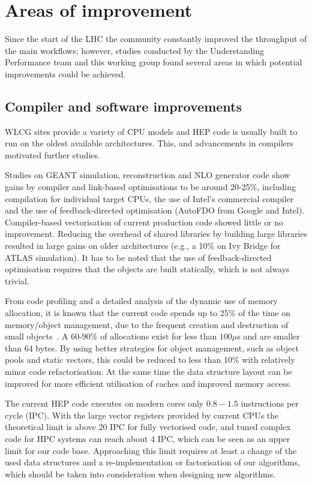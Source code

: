 \section{Areas of improvement}
Since the start of the LHC the community constantly improved the
throughput of the main workflows; however, studies conducted by the
Understanding Performance team and this working group found several
areas in which potential improvements could be
achieved.

\subsection{Compiler and software improvements}
WLCG sites provide a variety of CPU models and HEP code is usually
built to run on the oldest available architectures. This, and
advancements in compilers motivated further studies.

Studies on GEANT simulation, reconstruction and NLO generator code
show gains by compiler and link-based optimisations to be around
20-25\%, including compilation for individual target CPUs, the use of
Intel’s commercial compiler and the use of feedback-directed
optimisation (AutoFDO from Google and Intel). Compiler-based
vectorisation of current production code showed little or no
improvement. Reducing the overhead of shared libraries by building
large libraries resulted in large gains on older architectures (e.g.,
a 10\% on Ivy Bridge for ATLAS simulation). It has to be noted that
the use of feedback-directed optimisation requires that the objects
are built statically, which is not always trivial.

From code profiling and a detailed analysis of the dynamic use of
memory allocation, it is known that the current code spends up to 25\%
of the time on memory/object management, due to the frequent creation
and destruction of small objects~\cite{fomtools}. A 60-90\% of
allocations exist for less than $100\mu$s and are smaller than 64
bytes.  By using better strategies for object management, such as
object pools and static vectors, this could be reduced to less than
10\% with relatively minor code refactorisation. At the same time the
data structure layout can be improved for more efficient utilisation
of caches and improved memory access.

The current HEP code executes on modern cores only $0.8-1.5$
instructions per cycle (IPC). With the large vector registers provided by
current CPUs the theoretical limit is above 20 IPC for fully
vectorised code, and tuned complex code for HPC systems can reach
about 4 IPC, which can be seen as an upper limit for our code
base. Approaching this limit requires at least a change of the used
data structures and a re-implementation or factorisation of our
algorithms, which should be taken into consideration when
designing new algorithms.

